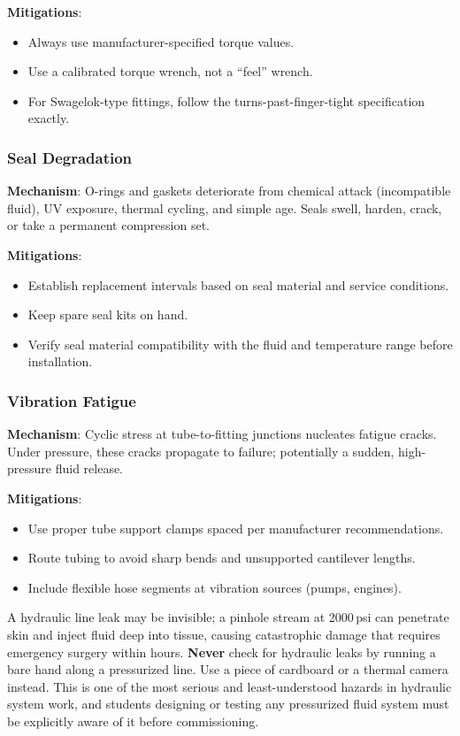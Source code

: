 \textbf{Mitigations}:
\begin{itemize}[nosep,leftmargin=1.5em]
  \item Always use manufacturer-specified torque values.
  \item Use a calibrated torque wrench, not a ``feel'' wrench.
  \item For Swagelok-type fittings, follow the turns-past-finger-tight specification exactly.
\end{itemize}

\subsubsection{Seal Degradation}

\textbf{Mechanism}: O-rings and gaskets deteriorate from chemical attack (incompatible fluid), UV exposure, thermal cycling, and simple age. Seals swell, harden, crack, or take a permanent compression set.

\textbf{Mitigations}:
\begin{itemize}[nosep,leftmargin=1.5em]
  \item Establish replacement intervals based on seal material and service conditions.
  \item Keep spare seal kits on hand.
  \item Verify seal material compatibility with the fluid and temperature range before installation.
\end{itemize}

\subsubsection{Vibration Fatigue}

\textbf{Mechanism}: Cyclic stress at tube-to-fitting junctions nucleates fatigue cracks. Under pressure, these cracks propagate to failure; potentially a sudden, high-pressure fluid release.

\textbf{Mitigations}:
\begin{itemize}[nosep,leftmargin=1.5em]
  \item Use proper tube support clamps spaced per manufacturer recommendations.
  \item Route tubing to avoid sharp bends and unsupported cantilever lengths.
  \item Include flexible hose segments at vibration sources (pumps, engines).
\end{itemize}

\begin{warningbox}
A hydraulic line leak may be invisible; a pinhole stream at 2000\,psi can penetrate skin and inject fluid deep into tissue, causing catastrophic damage that requires emergency surgery within hours. \textbf{Never} check for hydraulic leaks by running a bare hand along a pressurized line. Use a piece of cardboard or a thermal camera instead. This is one of the most serious and least-understood hazards in hydraulic system work, and students designing or testing any pressurized fluid system must be explicitly aware of it before commissioning.
\end{warningbox}


